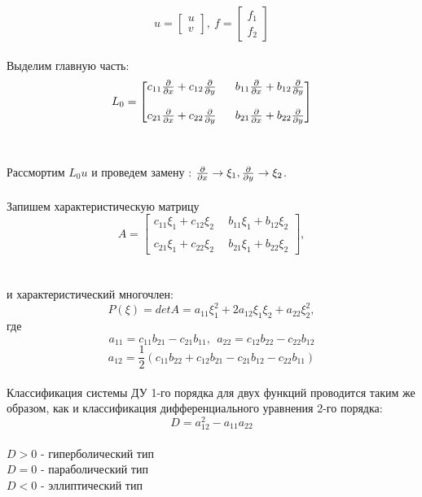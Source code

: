 \documentclass[../main.tex]{subfiles}
\begin{document}
$$u = \begin{bmatrix}
u \\ v
\end{bmatrix}, \  f = \begin{bmatrix}
f_1 \\ f_2
\end{bmatrix}$$ \\
Выделим главную часть: \\ 
$$
L_0 = \begin{bmatrix}
c_{11}\frac{\partial }{\partial x} + c_{12}\frac{\partial }{\partial y} \ & \ b_{11}\frac{\partial }{\partial x} + b_{12}\frac{\partial }{\partial y} \\ \\ 
c_{21}\frac{\partial }{\partial x} + c_{22}\frac{\partial }{\partial y} \ & \ b_{21}\frac{\partial }{\partial x} + b_{22}\frac{\partial }{\partial y} 
\end{bmatrix}
$$ \\ \\
Рассмортим $L_0u$ и проведем замену : $\frac{\partial }{\partial x} \rightarrow \xi_1, \frac{\partial }{\partial y} \rightarrow \xi_2$. \\
\\ Запишем характеристическую матрицу
$$
A = \begin{bmatrix}
c_{11}\xi_1 + c_{12}\xi_2 \ & \ b_{11}\xi_1 + b_{12}\xi_2 \\ \\ 
c_{21}\xi_1 + c_{22}\xi_2 \ & \ b_{21}\xi_1 + b_{22}\xi_2 
\end{bmatrix},
$$ \\ \\
и характеристический многочлен:\\
$$P(\xi) = detA = a_{11}\xi_1^2 + 2a_{12}\xi_1\xi_2+a_{22}\xi_2^2,$$
где
$$a_{11} = c_{11}b_{21} - c_{21}b_{11}, \ \ 
a_{22} = c_{12}b_{22} - c_{22}b_{12}$$
$$a_{12} = \frac{1}{2}(c_{11}b_{22} + c_{12}b_{21} - c_{21}b_{12} - c_{22}b_{11})$$ \\ 
Классификация системы ДУ 1-го порядка для двух функций проводится таким же образом, как и классификация дифференциального уравнения 2-го порядка:
\\$$D = a_{12}^2 - a_{11}a_{22} $$ \\
$D > 0$ - гиперболический тип \\
$D = 0$ - параболический тип \\
$D < 0$ - эллиптический тип \\
\\
\\
\end{document}
